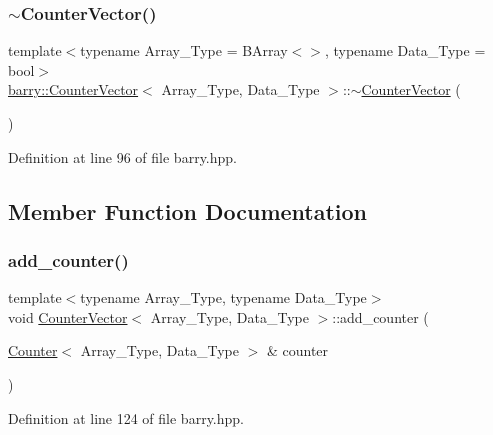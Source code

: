 \subsubsection{\texorpdfstring{$\sim$\+Counter\+Vector()}{~CounterVector()}}
{\footnotesize\ttfamily template$<$typename Array\+\_\+\+Type = B\+Array$<$$>$, typename Data\+\_\+\+Type = bool$>$ \\
\hyperlink{classbarry_1_1_counter_vector}{barry\+::\+Counter\+Vector}$<$ Array\+\_\+\+Type, Data\+\_\+\+Type $>$\+::$\sim$\hyperlink{classbarry_1_1_counter_vector}{Counter\+Vector} (\begin{DoxyParamCaption}{ }\end{DoxyParamCaption})\hspace{0.3cm}{\ttfamily [inline]}}



Definition at line 96 of file barry.\+hpp.



\subsection{Member Function Documentation}
\mbox{\label{classbarry_1_1_counter_vector_a34fda06ff678691daf3b0455c1a2af48}} 
\subsubsection{\texorpdfstring{add\+\_\+counter()}{add\_counter()}\hspace{0.1cm}{\footnotesize\ttfamily [1/3]}}
{\footnotesize\ttfamily template$<$typename Array\+\_\+\+Type, typename Data\+\_\+\+Type$>$ \\
void \hyperlink{classbarry_1_1_counter_vector}{Counter\+Vector}$<$ Array\+\_\+\+Type, Data\+\_\+\+Type $>$\+::add\+\_\+counter (\begin{DoxyParamCaption}\item[{\hyperlink{classbarry_1_1_counter}{Counter}$<$ Array\+\_\+\+Type, Data\+\_\+\+Type $>$ \&}]{counter }\end{DoxyParamCaption})\hspace{0.3cm}{\ttfamily [inline]}}



Definition at line 124 of file barry.\+hpp.

